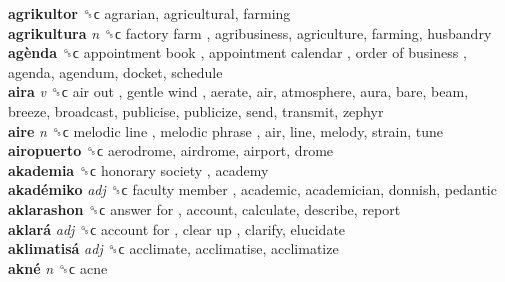 \textbf{agrikultor} ␝ϲ  agrarian, agricultural, farming  \\
\textbf{agrikultura} \emph{n}  ␝ϲ   factory farm , agribusiness, agriculture, farming, husbandry  \\
\textbf{agènda} ␝ϲ   appointment book ,  appointment calendar ,  order of business , agenda, agendum, docket, schedule  \\
\textbf{aira} \emph{v}  ␝ϲ   air out ,  gentle wind , aerate, air, atmosphere, aura, bare, beam, breeze, broadcast, publicise, publicize, send, transmit, zephyr  \\
\textbf{aire} \emph{n}  ␝ϲ   melodic line ,  melodic phrase , air, line, melody, strain, tune  \\
\textbf{airopuerto} ␝ϲ  aerodrome, airdrome, airport, drome  \\
\textbf{akademia} ␝ϲ   honorary society , academy  \\
\textbf{akadémiko} \emph{adj}  ␝ϲ   faculty member , academic, academician, donnish, pedantic  \\
\textbf{aklarashon} ␝ϲ   answer for , account, calculate, describe, report  \\
\textbf{aklará} \emph{adj}  ␝ϲ   account for ,  clear up , clarify, elucidate  \\
\textbf{aklimatisá} \emph{adj}  ␝ϲ  acclimate, acclimatise, acclimatize  \\
\textbf{akné} \emph{n}  ␝ϲ  acne  \\
